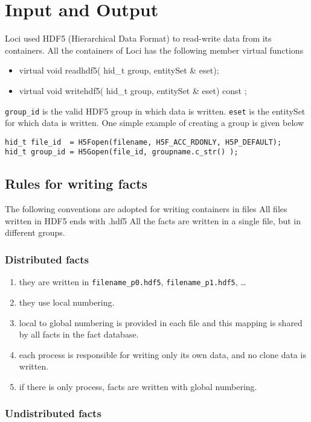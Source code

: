 \chapter{Input and Output}
Loci used HDF5 (Hierarchical Data Format)  to read-write data from its 
containers. All the containers of Loci has the following member virtual functions
%
\begin{itemize} 
\item virtual void readhdf5( hid\_t group, entitySet \&  eset);
\item virtual void writehdf5( hid\_t group, entitySet \& eset) const ;
\end{itemize}
%
{\tt group\_id} is the valid HDF5 group in which data is written. {\tt eset} is
the entitySet for which data is written. One simple example of
creating a group is given below
%
\begin{verbatim} 
hid_t file_id  = H5Fopen(filename, H5F_ACC_RDONLY, H5P_DEFAULT);
hid_t group_id = H5Gopen(file_id, groupname.c_str() );
\end{verbatim} 

\section {Rules for writing facts}
The following conventions are adopted for writing containers in files
All files written in HDF5 ends with .hdf5
All the facts are written in a single file, but in different groups.
\subsection {Distributed facts}
\begin{enumerate}
\item they are written in {\tt filename\_p0.hdf5}, {\tt filename\_p1.hdf5}, \dots
\item they use local numbering.
\item local to global numbering is provided in each file and this
mapping is shared by all facts in the fact database.
\item each process is responsible for writing only its own data, and
no clone data is written.
\item if there is only process, facts are written with global numbering.
\end{enumerate}

\subsection {Undistributed facts}

